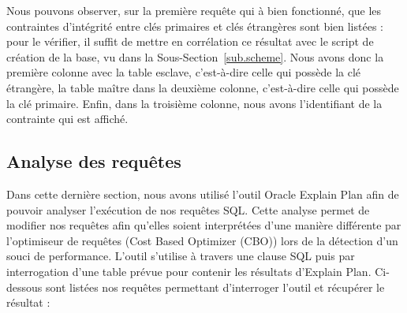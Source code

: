 \documentclass[12pt,a4paper]{article}
\begin{document}
Nous pouvons observer, sur la première requête qui à bien fonctionné, que les
contraintes d’intégrité entre clés primaires et clés étrangères sont bien
listées : pour le vérifier, il suffit de mettre en corrélation ce résultat avec
le script de création de la base, vu dans la Sous-Section~\ref{sub.scheme}. Nous
avons donc la première colonne avec la table esclave, c’est-à-dire celle qui
possède la clé étrangère, la table maître dans la deuxième colonne, c’est-à-dire
celle qui possède la clé primaire. Enfin, dans la troisième colonne, nous avons
l’identifiant de la contrainte qui est affiché.

\subsection{Analyse des requêtes}
\label{sub.analyze}

Dans cette dernière section, nous avons utilisé l'outil Oracle Explain Plan afin
de pouvoir analyser l’exécution de nos requêtes SQL. Cette analyse permet de
modifier nos requêtes afin qu’elles soient interprétées d’une manière différente
par l’optimiseur de requêtes (Cost Based Optimizer (CBO)) lors de la détection
d’un souci de performance. L’outil s’utilise à travers une clause SQL puis par
interrogation d’une table prévue pour contenir les résultats d’Explain Plan.
Ci-dessous sont listées nos requêtes permettant d’interroger l’outil et récupérer
le résultat :
\end{document}
